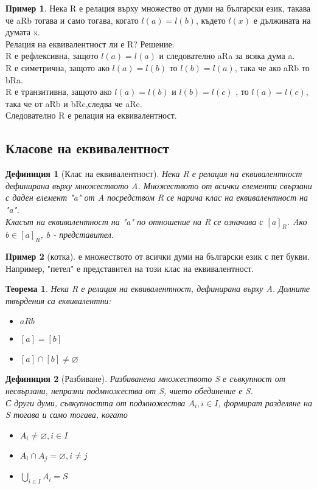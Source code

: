 \documentclass[fleqn, 12pt]{article}
\newtheorem{definition}{Дефиниция}[subsection]
\newtheorem{theorem}{Теорема}[subsection]
\theoremstyle{definition}
\newtheorem{example}{Пример}[subsection]
\begin{document}
\begin{example}
Нека R е релация върху множество от думи на български език, такава че aRb тогава и само тогава, когато $l(a) = l(b)$, където $l(x)$ е дължината на думата x.\\
Релация на еквивалентност ли е R?
Решение: \\
R е рефлексивна, защото $l(a) = l(a)$ и следователно aRa за всяка дума a.\\
R е симетрична, защото ако $l(a) = l(b)$ то $l(b) = l(a)$, така че ако aRb то bRa.\\
R е транзитивна, защото ако $l(a) = l(b)$ и $l(b) = l(c)$ , то $l(a) = l(c)$, така че от aRb и bRc,следва че aRc.\\
Следователно R е релация на еквивалентност.
\end{example}

\subsection{Класове на еквивалентност}

\begin{definition}[Клас на еквивалентност]
Нека R е релация на еквивалентност дефинирана върху множеството A. Множеството от всички елементи свързани с даден елемент "a"\! от A посредством R се нарича клас на еквивалентност на "a". \\
Класът на еквивалентност на "a" \! по отношение на R се означава с $[a]_R$.
Aко $b \in [a]_R$, b - представител.
\end{definition}

\begin{example}
[котка] е множеството от всички думи на български език с пет букви. Например, "петел" е представител на този клас на еквивалентност.
\end{example}

\begin{theorem}
Нека R е релация на еквивалентност, дефинирана върху A. Долните твърдения са еквивалентни:
\begin{itemize}
\item $aRb$
\item $[a] = [b]$
\item $[a] \cap [b] \neq \varnothing$
\end{itemize}
\end{theorem}

\begin{definition}[Разбиване]
Разбиванена множеството S е съвкупност от несвързани, непразни подмножества от S, чието обединение е S. \\
С други думи, съвкупността от подмножества $A_i, i\in I$, формират разделяне на S тогава и само тогава, когато

\begin{itemize}
\item $A_i \neq \varnothing, i \in I$
\item $A_i \cap A_j = \varnothing, i \neq j$
\item $\bigcup_{i \in I} A_i = S$
\end{itemize}

\end{definition}
\end{document}
